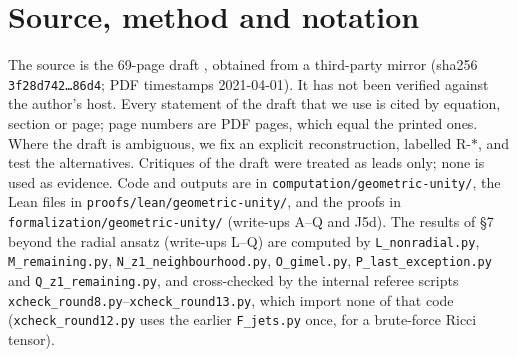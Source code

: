 \documentclass[11pt]{article}
\theoremstyle{remark}
\begin{document}
\section{Source, method and notation}
The source is the 69-page draft \cite{W21}, obtained from a third-party mirror (sha256 \texttt{3f28d742\ldots86d4}; PDF timestamps 2021-04-01). It has not been verified against the author's host. Every statement of the draft that we use is cited by equation, section or page; page numbers are PDF pages, which equal the printed ones. Where the draft is ambiguous, we fix an explicit reconstruction, labelled R-$\ast$, and test the alternatives. Critiques of the draft were treated as leads only; none is used as evidence. Code and outputs are in \texttt{computation/geometric-unity/}, the Lean files in \texttt{proofs/lean/geometric-unity/}, and the proofs in \texttt{formalization/geometric-unity/} (write-ups A--Q and J5d). The results of \S7 beyond the radial ansatz (write-ups L--Q) are computed by \texttt{L\_nonradial.py}, \texttt{M\_remaining.py}, \texttt{N\_z1\_neighbourhood.py}, \texttt{O\_gimel.py}, \texttt{P\_last\_exception.py} and \texttt{Q\_z1\_remaining.py}, and cross-checked by the internal referee scripts \texttt{xcheck\_round8.py}--\texttt{xcheck\_round13.py}, which import none of that code (\texttt{xcheck\_round12.py} uses the earlier \texttt{F\_jets.py} once, for a brute-force Ricci tensor).
\end{document}
